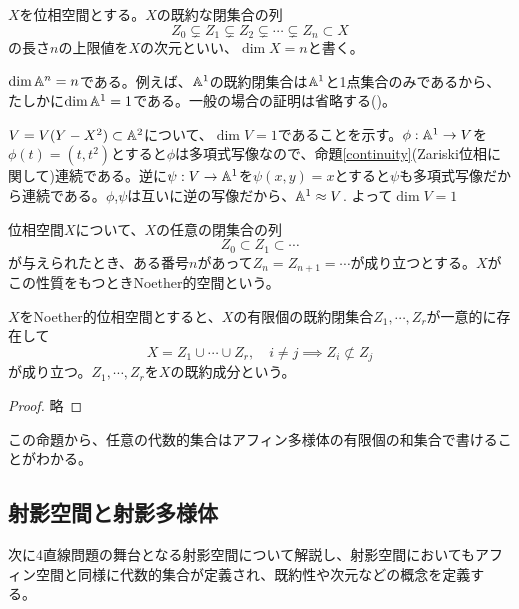 \documentclass{ltjsreport}
\begin{document}
\begin{defin}
  $X$を位相空間とする。$X$の既約な閉集合の列
  \[
  Z_0\subsetneq Z_1\subsetneq Z_2\subsetneq\cdots\subsetneq Z_n\subset X   
  \]
  の長さ$n$の上限値を$X$の次元といい、$\dim X=n$と書く。
\end{defin}

\begin{eg}
  $\dim\mathbb{A}^n=n$である。例えば、$\mathbb{A}^1$の既約閉集合は$\mathbb{A}^1$と1点集合のみであるから、たしかに$\dim\mathbb{A}^1=1$である。一般の場合の証明は省略する(\cite{RH})。
\end{eg}

\begin{eg}
  $V=V(Y-X^2)\subset\mathbb{A}^2$について、$\dim V=1$であることを示す。$\phi:\mathbb{A}^1\rightarrow V$を$\phi(t)=(t,t^2)$とすると$\phi$は多項式写像なので、命題\ref{continuity}(Zariski位相に関して)連続である。逆に$\psi:V\rightarrow \mathbb{A}^1$を$\psi(x,y)=x$とすると$\psi$も多項式写像だから連続である。$\phi$,$\psi$は互いに逆の写像だから、$\mathbb{A}^1\approx V$. よって$\dim V=1$
\end{eg}

\begin{defin}
  位相空間$X$について、$X$の任意の閉集合の列
  \[
  Z_0\subset Z_1\subset\cdots  
  \]
  が与えられたとき、ある番号$n$があって$Z_n=Z_{n+1}=\cdots$が成り立つとする。$X$がこの性質をもつときNoether的空間という。
\end{defin}

\begin{prop}
  $X$をNoether的位相空間とすると、$X$の有限個の既約閉集合$Z_1,\cdots,Z_r$が一意的に存在して
  \[
  X=Z_1\cup\cdots\cup Z_r  ,\quad i\neq j\implies Z_i\not\subset Z_j
  \]
  が成り立つ。$Z_1,\cdots,Z_r$を$X$の既約成分という。
\end{prop}

\begin{proof}
  略
\end{proof}

この命題から、任意の代数的集合はアフィン多様体の有限個の和集合で書けることがわかる。






\subsection{射影空間と射影多様体}

次に4直線問題の舞台となる射影空間について解説し、射影空間においてもアフィン空間と同様に代数的集合が定義され、既約性や次元などの概念を定義する。
\end{document}

